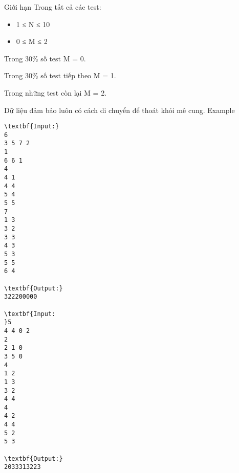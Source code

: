 Giới hạn
Trong tất cả các test:
\begin{itemize}
	\item 1 ≤ N ≤ 10
	\item 0 ≤ M ≤ 2
\end{itemize}

Trong 30\% số test M = 0.

Trong 30\% số test tiếp theo M = 1.

Trong những test còn lại M = 2.

Dữ liệu đảm bảo luôn có cách di chuyển để thoát khỏi mê cung.
Example
\begin{verbatim}
\textbf{Input:}
6
3 5 7 2
1
6 6 1
4 
4 1
4 4
5 4
5 5
7
1 3
3 2
3 3
4 3
5 3
5 5
6 4

\textbf{Output:}
322200000
 
\textbf{Input:
}5
4 4 0 2
2
2 1 0
3 5 0
4
1 2
1 3
3 2
4 4
4
4 2
4 4
5 2
5 3

\textbf{Output:}
2033313223\end{verbatim}